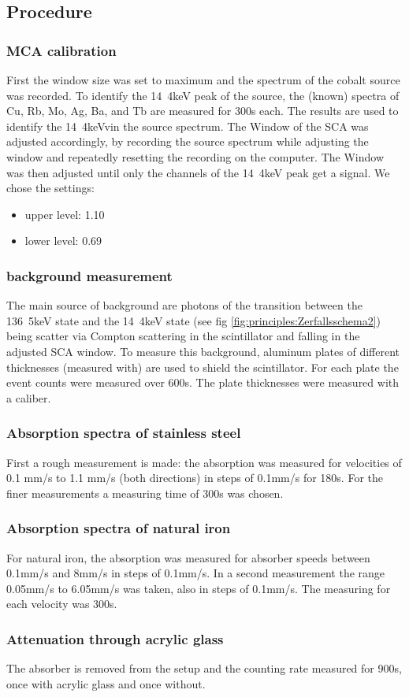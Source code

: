 \subsection{Procedure}
\subsubsection{MCA calibration}
First the window size was set to maximum and the spectrum of the cobalt source was recorded.
To identify the \unit{14.4}{keV} peak of the source, the (known) spectra of Cu, Rb, Mo, Ag, Ba, and Tb are measured for 300s each. The results are used to identify the \unit{14.4}{keV}vin the source spectrum. The Window of the SCA was adjusted accordingly, by recording the source spectrum while adjusting the window and repeatedly resetting the recording on the computer. The Window was then adjusted until only the channels of the \unit{14.4}{keV} peak get a signal. We chose the settings:
\begin{itemize}
	\item upper level: 1.10
	\item lower level: 0.69
\end{itemize}

\subsubsection{background measurement}
The main source of background are photons of the transition between the \unit{136.5}{keV} state and the \unit{14.4}{keV} state (see fig \ref{fig:principles:Zerfallsschema2}) being scatter via Compton scattering in the scintillator and falling in the adjusted SCA window. To measure this background, aluminum plates of different thicknesses (measured with) are used to shield the scintillator. For each plate the event counts were measured over 600s. The plate thicknesses were measured with a caliber. 

\subsubsection{Absorption spectra of stainless steel}
First a rough measurement is made: the absorption was measured for velocities of 0.1 mm/s to 1.1 mm/s (both directions) in steps of 0.1mm/s for 180s. For the finer measurements a measuring time of 300s was chosen.
\subsubsection{Absorption spectra of natural iron}
For natural iron, the absorption was measured for absorber speeds between 0.1mm/s and 8mm/s in steps of 0.1mm/s. In a second measurement the range 0.05mm/s to 6.05mm/s was taken, also in steps of 0.1mm/s. The measuring for each velocity was 300s.
\subsubsection{Attenuation through acrylic glass}
The absorber is removed from the setup and the counting rate measured for 900s, once with acrylic glass and once without.
